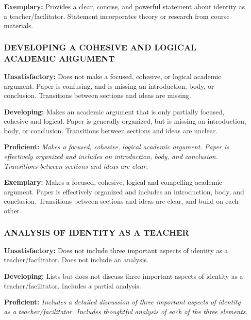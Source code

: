 \documentclass[
]{book}
\begin{document}
\textbf{Exemplary:} Provides a clear, concise, and powerful statement about identity as a teacher/facilitator. Statement incorporates theory or research from course materials.

\hypertarget{developing-a-cohesive-and-logical-academic-argument}{%
\subsubsection*{DEVELOPING A COHESIVE AND LOGICAL ACADEMIC ARGUMENT}\label{developing-a-cohesive-and-logical-academic-argument}}

\textbf{Unsatisfactory:} Does not make a focused, cohesive, or logical academic argument. Paper is confusing, and is missing an introduction, body, or conclusion. Transitions between sections and ideas are missing.

\textbf{Developing:} Makes an academic argument that is only partially focused, cohesive and logical. Paper is generally organized, but is missing an introduction, body, or conclusion. Transitions between sections and ideas are unclear.

\textbf{Proficient:} \emph{Makes a focused, cohesive, logical academic argument. Paper is effectively organized and includes an introduction, body, and conclusion. Transitions between sections and ideas are clear.}

\textbf{Exemplary:} Makes a focused, cohesive, logical and compelling academic argument. Paper is effectively organized and includes an introduction, body, and conclusion. Transitions between sections and ideas are clear, and build on each other.

\hypertarget{analysis-of-identity-as-a-teacher}{%
\subsubsection*{ANALYSIS OF IDENTITY AS A TEACHER}\label{analysis-of-identity-as-a-teacher}}

\textbf{Unsatisfactory:} Does not include three important aspects of identity as a teacher/facilitator. Does not include an analysis.

\textbf{Developing:} Lists but does not discuss three important aspects of identity as a teacher/facilitator. Includes a partial analysis.

\textbf{Proficient:} \emph{Includes a detailed discussion of three important aspects of identity as a teacher/facilitator. Includes thoughtful analysis of each of the three elements.}
\end{document}
